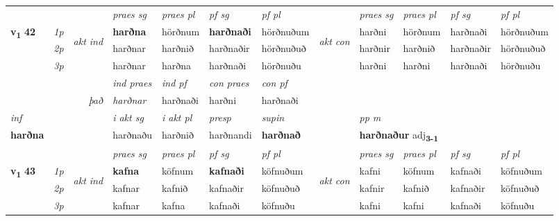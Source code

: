 \begin{longtable}[l]{X>{\footnotesize\itshape}llXXXXlXXXX}
 & &   & \textit{praes sg}  & \textit{praes pl}    & \textit{ pf sg} & \textit{pf pl} & & \textit{praes sg}  & \textit{praes pl}    & \textit{pf sg} & \textit{pf pl }  \\ \cmidrule{4-7} \cmidrule{9-12}
 \multirow{2}{*}{{{\textbf{v{\textsubscript{1}}} \Large{\textbf{42}}}}}  & 1p & \multirow{3}{*}{\begin{turn}{90}\textit{akt ind}\end{turn}} & \textbf{harðna} & hörðnum & \textbf{harðnaði} & hörðnuðum & \multirow{3}{*}{\begin{turn}{90}\textit{akt con}\end{turn}} &harðni & hörðnum & harðnaði & hörðnuðum\\*
 & 2p &  &  harðnar  & harðnið & harðnaðir & hörðnuðuð & & harðnir & harðnið & harðnaðir & hörðnuðuð \\*
 & 3p &  & harðnar & harðna & harðnaði & hörðnuðu & & harðni & harðni& harðnaði & hörðnuðu \\*
\cmidrule{4-7} \cmidrule{9-12}

   && &  \textit{ind praes} & \textit{ind pf} & \textit{con praes} & \textit{con pf} \\*
\multicolumn{3}{r}{\textit{það}} & harðnar & harðnaði & harðni & harðnaði \\*

\cmidrule{4-7}
   {\textit{inf}} & &  & \textit{i akt sg} & \textit{i akt pl}   & \textit{presp} & \textit{supin}  && \textit{pp m} \\*
  {\textbf{harðna}} & && harðnaðu  & harðnið   & harðnandi &  \textbf{harðnað}  && \multicolumn{2}{l}{\textbf{harðnaður} adj\textbf{\textsubscript{3-1}}} \\*

\midrule

 & &   & \textit{praes sg}  & \textit{praes pl}    & \textit{ pf sg} & \textit{pf pl} & & \textit{praes sg}  & \textit{praes pl}    & \textit{pf sg} & \textit{pf pl }  \\ \cmidrule{4-7} \cmidrule{9-12}
 \multirow{2}{*}{{{\textbf{v{\textsubscript{1}}} \Large{\textbf{43}}}}}  & 1p & \multirow{3}{*}{\begin{turn}{90}\textit{akt ind}\end{turn}} & \textbf{kafna} & köfnum & \textbf{kafnaði} & köfnuðum & \multirow{3}{*}{\begin{turn}{90}\textit{akt con}\end{turn}} &kafni & köfnum & kafnaði & köfnuðum\\*
 & 2p &  &  kafnar  & kafnið & kafnaðir & köfnuðuð & & kafnir & kafnið & kafnaðir & köfnuðuð \\*
 & 3p &  & kafnar & kafna & kafnaði & köfnuðu & & kafni & kafni& kafnaði & köfnuðu \\*
\cmidrule{4-7} \cmidrule{9-12}


\end{longtable}
